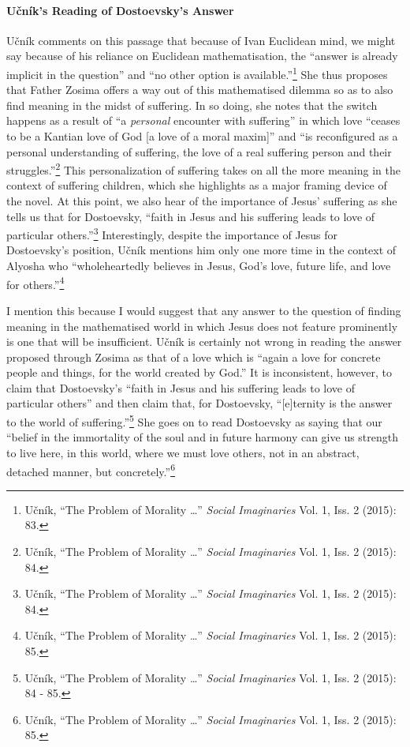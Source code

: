 \documentclass[12pt]{article}
\begin{document}
	\paragraph*{U\v{c}n\'{i}k's Reading of Dostoevsky's Answer} U\v{c}n\'{i}k comments on this passage that because of Ivan Euclidean mind, we might say because of his reliance on Euclidean mathematisation, the ``answer is already implicit in the question'' and ``no other option is available.''\footnote{U\v{c}n\'{i}k, ``The Problem of Morality \ldots'' \emph{Social Imaginaries} Vol. 1, Iss. 2 (2015): 83.} She thus proposes that Father Zosima offers a way out of this mathematised dilemma so as to also find meaning in the midst of suffering. In so doing, she notes that the switch happens as a result of ``a \emph{personal} encounter with suffering'' in which love ``ceases to be a Kantian love of God [a love of a moral maxim]'' and ``is reconfigured as a personal understanding of suffering, the love of a real suffering person and their struggles.''\footnote{U\v{c}n\'{i}k, ``The Problem of Morality \ldots'' \emph{Social Imaginaries} Vol. 1, Iss. 2 (2015): 84.} This personalization of suffering takes on all the more meaning in the context of suffering children, which she highlights as a major framing device of the novel. At this point, we also hear of the importance of Jesus' suffering as she tells us that for Dostoevsky, ``faith in Jesus and his suffering leads to love of particular others.''\footnote{U\v{c}n\'{i}k, ``The Problem of Morality \ldots'' \emph{Social Imaginaries} Vol. 1, Iss. 2 (2015): 84.} Interestingly, despite the importance of Jesus for Dostoevsky's position, U\v{c}n\'{i}k mentions him only one more time in the context of Alyosha who ``wholeheartedly believes in Jesus, God's love, future life, and love for others.''\footnote{U\v{c}n\'{i}k, ``The Problem of Morality \ldots'' \emph{Social Imaginaries} Vol. 1, Iss. 2 (2015): 85.}
	
	I mention this because I would suggest that any answer to the question of finding meaning in the mathematised world in which Jesus does not feature prominently is one that will be insufficient. U\v{c}n\'{i}k is certainly not wrong in reading the answer proposed through Zosima as that of a love which is ``again a love for concrete people and things, for the world created by God.'' It is inconsistent, however, to claim that Dostoevsky's ``faith in Jesus and his suffering leads to love of particular others'' and then claim that, for Dostoevsky, ``[e]ternity is the answer to the world of suffering.''\footnote{U\v{c}n\'{i}k, ``The Problem of Morality \ldots'' \emph{Social Imaginaries} Vol. 1, Iss. 2 (2015): 84 - 85.} She goes on to read Dostoevsky as saying that our ``belief in the immortality of the soul and in future harmony can give us strength to live here, in this world, where we must love others, not in an abstract, detached manner, but concretely.''\footnote{U\v{c}n\'{i}k, ``The Problem of Morality \ldots'' \emph{Social Imaginaries} Vol. 1, Iss. 2 (2015): 85.} 
	
\end{document}
